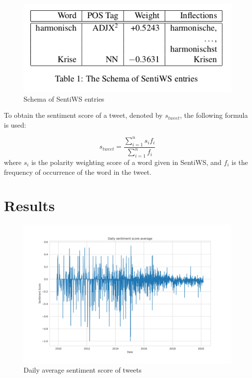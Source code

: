 \documentclass[10pt,twocolumn,twoside]{layout}
\begin{document}
\begin{figure} 
	\begin{center}
		\includegraphics[width=\linewidth]{figures/sentiws_example}
	\end{center}
	\caption{Schema of SentiWS entries}
	\label{fig:sentiws_example}
\end{figure}

To obtain the sentiment score of a tweet, denoted by \(s_{tweet}\), the following formula is used: 

\begin{equation}
\label{eq:word_score}
s_{tweet} = \frac{\sum_{i=1}^{n} s_i f_i}{\sum_{i=1}^{n} f_i}
\end{equation} 
where \(s_i\) is the polarity weighting score of a word given in SentiWS, and \(f_i\) is the frequency of occurrence of the word in the tweet. 



\section*{Results} \label{sec:results}

\begin{figure} 
	\begin{center}
		\includegraphics[width=\linewidth]{figures/dailyavgsenti}
	\end{center}
	\caption{Daily average sentiment score of tweets}
	\label{fig:tweet_score}
\end{figure}
\end{document}
